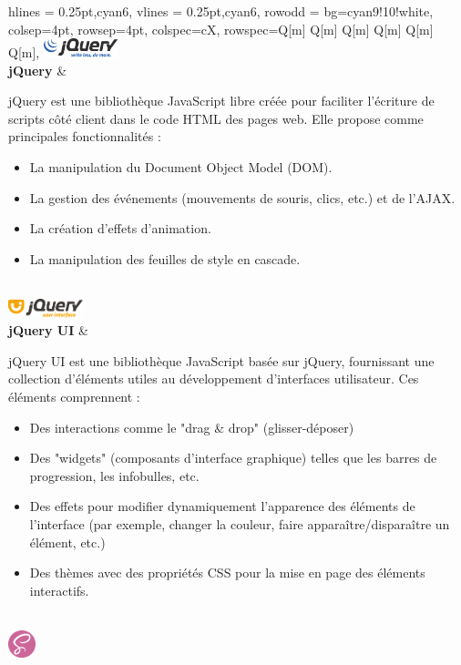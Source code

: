\begin{longtblr}[caption={Technologies utilisées au niveau du front-end}]{
    hlines = {0.25pt,cyan6},
    vlines = {0.25pt,cyan6},
    row{odd} = {bg=cyan9!10!white},
    colsep=4pt,
    rowsep=4pt,
	colspec={cX},
    rowspec={Q[m] Q[m] Q[m] Q[m] Q[m] Q[m]},
}
{\includegraphics[height=5.5mm]{images/sec5/jquery.pdf}
 \\\textbf{jQuery}
}
&  
\begin{minipage}{\linewidth}
jQuery est une bibliothèque JavaScript libre créée pour faciliter l'écriture de scripts côté client dans le code HTML des pages web. Elle propose comme principales fonctionnalités :
\raggedright
\begin{itemize}[leftmargin=*]
\item La manipulation du Document Object Model (DOM).
\item La gestion des événements (mouvements de souris, clics, etc.) et de l'AJAX.
\item La création d'effets d'animation.
\item La manipulation des feuilles de style en cascade.
\end{itemize}
\end{minipage}
\\
{\includegraphics[height=5.5mm]{images/sec5/jqueryui.pdf}
 \\\textbf{jQuery UI}
 }
 & 
 \begin{minipage}{\linewidth}
	jQuery UI est une bibliothèque JavaScript basée sur jQuery, fournissant une collection d'éléments utiles au développement d'interfaces utilisateur. Ces éléments comprennent :
    \raggedright
\begin{itemize}[leftmargin=*]
	\item Des interactions comme le "drag \& drop" (glisser-déposer)
	\item Des "widgets" (composants d'interface graphique) telles que les barres de progression, les infobulles, etc.
	\item Des effets pour modifier dynamiquement l'apparence des éléments de l'interface (par exemple, changer la couleur, faire apparaître/disparaître un élément, etc.)
	\item Des thèmes avec des propriétés CSS pour la mise en page des éléments interactifs.
\end{itemize}
\end{minipage}
 \\
 {\includegraphics[height=8mm]{images/sec5/sass.pdf}
}
\end{longtblr}
